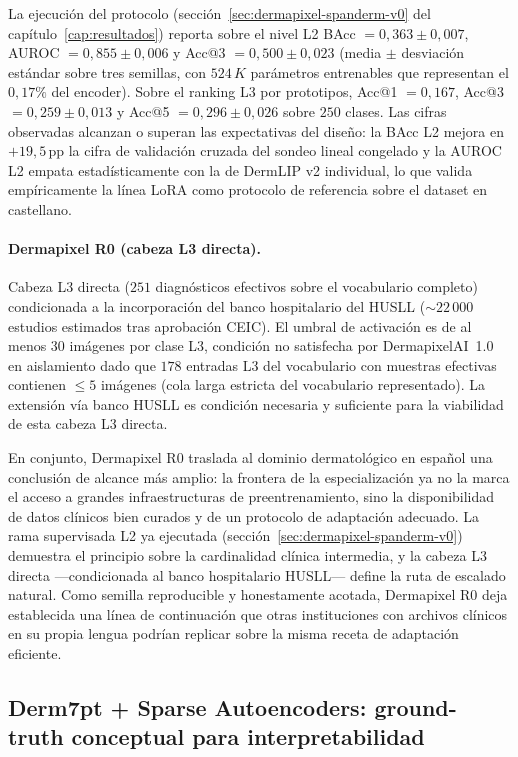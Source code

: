 La ejecución del protocolo (sección~\ref{sec:dermapixel-spanderm-v0}
del capítulo~\ref{cap:resultados}) reporta sobre el nivel L2
BAcc $= 0{,}363 \pm 0{,}007$, AUROC $= 0{,}855 \pm 0{,}006$ y
Acc@3 $= 0{,}500 \pm 0{,}023$ (media $\pm$ desviación estándar
sobre tres semillas, con $524\,K$ parámetros entrenables que
representan el $0{,}17\%$ del encoder). Sobre el ranking L3 por
prototipos, Acc@1 $= 0{,}167$, Acc@3 $= 0{,}259 \pm 0{,}013$ y
Acc@5 $= 0{,}296 \pm 0{,}026$ sobre $250$ clases. Las cifras
observadas alcanzan o superan las expectativas del diseño: la
BAcc L2 mejora en $+19{,}5$\,pp la cifra de validación cruzada
del sondeo lineal congelado y la AUROC L2 empata
estadísticamente con la de DermLIP v2 individual, lo que valida
empíricamente la línea LoRA como protocolo de referencia sobre el
dataset en castellano.

\paragraph{Dermapixel R0 (cabeza L3 directa).}
Cabeza L3 directa ($251$ diagnósticos efectivos sobre el
vocabulario completo) condicionada a la incorporación del banco
hospitalario del HUSLL ($\sim 22\,000$ estudios estimados tras
aprobación CEIC). El umbral de activación es de al menos
$30$ imágenes por clase L3, condición no satisfecha por
DermapixelAI~1.0 en aislamiento dado que $178$ entradas L3 del
vocabulario con muestras efectivas contienen $\leq 5$ imágenes
(cola larga estricta del vocabulario representado). La extensión vía
banco HUSLL es condición necesaria y suficiente para la viabilidad
de esta cabeza L3 directa.

En conjunto, Dermapixel R0 traslada al dominio dermatológico en
español una conclusión de alcance más amplio: la frontera de la
especialización ya no la marca el acceso a grandes infraestructuras de
preentrenamiento, sino la disponibilidad de datos clínicos bien
curados y de un protocolo de adaptación adecuado. La rama supervisada
L2 ya ejecutada (sección~\ref{sec:dermapixel-spanderm-v0}) demuestra
el principio sobre la cardinalidad clínica intermedia, y la cabeza L3
directa ---condicionada al banco hospitalario HUSLL--- define la ruta
de escalado natural. Como semilla reproducible y honestamente acotada,
Dermapixel R0 deja establecida una línea de continuación que otras
instituciones con archivos clínicos en su propia lengua podrían
replicar sobre la misma receta de adaptación eficiente.

\subsection{Derm7pt + Sparse Autoencoders: ground-truth conceptual
para interpretabilidad}
\label{sec:linea-derm7pt-sae}

